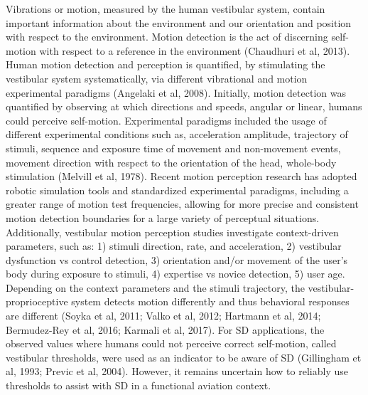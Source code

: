 \documentclass[11pt, onecolumn]{article}
\begin{document}
Vibrations or motion, measured by the human vestibular system, contain important information about the environment and our orientation and position with respect to the environment.  Motion detection is the act of discerning self-motion with respect to a reference in the environment (Chaudhuri et al, 2013).  Human motion detection and perception is quantified, by stimulating the vestibular system systematically, via different vibrational and motion experimental paradigms (Angelaki et al, 2008). Initially, motion detection was quantified by observing at which directions and speeds, angular or linear, humans could perceive self-motion.  Experimental paradigms included the usage of different experimental conditions such as, acceleration amplitude, trajectory of stimuli, sequence and exposure time of movement and non-movement events, movement direction with respect to the orientation of the head, whole-body stimulation (Melvill et al, 1978).  Recent motion perception research has adopted robotic simulation tools and standardized experimental paradigms, including a greater range of motion test frequencies, allowing for more precise and consistent motion detection boundaries for a large variety of perceptual situations.  Additionally, vestibular motion perception studies investigate context-driven parameters, such as: 1) stimuli direction, rate, and acceleration, 2) vestibular dysfunction vs control detection, 3) orientation and/or movement of the user's body during exposure to stimuli, 4) expertise vs novice detection, 5) user age.  Depending on the context parameters and the stimuli trajectory, the vestibular-proprioceptive system detects motion differently and thus behavioral responses are different (Soyka et al, 2011; Valko et al, 2012; Hartmann et al, 2014; Bermudez-Rey et al, 2016; Karmali et al, 2017).  For SD applications, the observed values where humans could not perceive correct self-motion, called vestibular thresholds, were used as an indicator to be aware of SD (Gillingham et al, 1993; Previc et al, 2004).  However, it remains uncertain how to reliably use thresholds to assist with SD in a functional aviation context.
\end{document}
